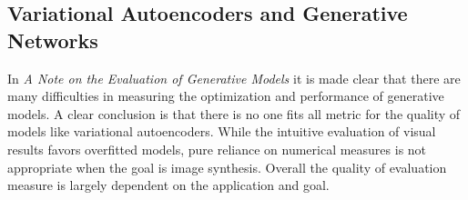 \subsection{Variational Autoencoders and Generative Networks}

In \textit{A Note on the Evaluation of Generative Models} \parencite{2015-theis-generative}
it is made clear that there are many difficulties in
measuring the optimization and performance of generative models. A clear conclusion is that there is no 
one fits all metric for the quality of models like variational autoencoders. While the intuitive evaluation
of visual results favors overfitted models, pure reliance on numerical measures is not appropriate when the
goal is image synthesis. Overall the quality of evaluation measure is largely dependent on the application
and goal.\\



